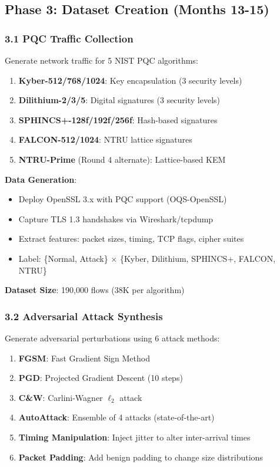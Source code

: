 \documentclass[11pt]{article}
\begin{document}
\subsection{Phase 3: Dataset Creation (Months 13-15)}

\subsubsection{3.1 PQC Traffic Collection}

Generate network traffic for 5 NIST PQC algorithms:

\begin{enumerate}
    \item \textbf{Kyber-512/768/1024}: Key encapsulation (3 security levels)
    \item \textbf{Dilithium-2/3/5}: Digital signatures (3 security levels)
    \item \textbf{SPHINCS+-128f/192f/256f}: Hash-based signatures
    \item \textbf{FALCON-512/1024}: NTRU lattice signatures
    \item \textbf{NTRU-Prime} (Round 4 alternate): Lattice-based KEM
\end{enumerate}

\textbf{Data Generation}:
\begin{itemize}
    \item Deploy OpenSSL 3.x with PQC support (OQS-OpenSSL)
    \item Capture TLS 1.3 handshakes via Wireshark/tcpdump
    \item Extract features: packet sizes, timing, TCP flags, cipher suites
    \item Label: \{Normal, Attack\} $\times$ \{Kyber, Dilithium, SPHINCS+, FALCON, NTRU\}
\end{itemize}

\textbf{Dataset Size}: 190,000 flows (38K per algorithm)

\subsubsection{3.2 Adversarial Attack Synthesis}

Generate adversarial perturbations using 6 attack methods:

\begin{enumerate}
    \item \textbf{FGSM}: Fast Gradient Sign Method
    \item \textbf{PGD}: Projected Gradient Descent (10 steps)
    \item \textbf{C\&W}: Carlini-Wagner $\ell_2$ attack
    \item \textbf{AutoAttack}: Ensemble of 4 attacks (state-of-the-art)
    \item \textbf{Timing Manipulation}: Inject jitter to alter inter-arrival times
    \item \textbf{Packet Padding}: Add benign padding to change size distributions
\end{enumerate}
\end{document}
